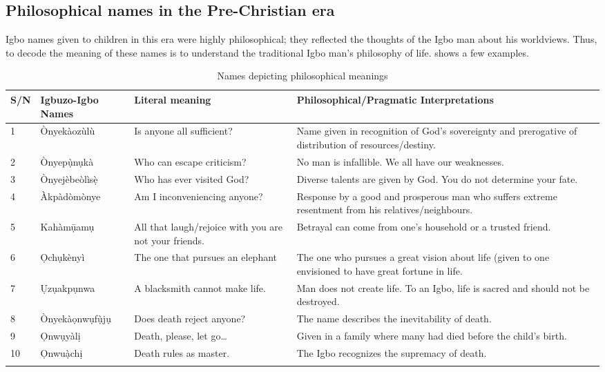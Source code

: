 \documentclass[output=paper]{langscibook}
\begin{document}
\subsection{Philosophical names in the Pre-Christian era}
Igbo names given to children in this era were highly philosophical; they reflected the thoughts of the Igbo man about his worldviews. Thus, to decode the meaning of these names is to understand the traditional Igbo man’s philosophy of life.  shows a few examples.


\begin{sidewaystable}
\caption{\label{tab:owaleke:3.8} Names depicting philosophical meanings}
\begin{tabularx}{\textwidth}{llQQ}
\lsptoprule
{S/N} & {Igbuzo-Igbo Names}     & {Literal meaning}    & {Philosophical/Pragmatic Interpretations}\\\midrule
{1}   & {Ònyekàozùlù}      & {Is anyone all sufficient?}  & {Name given in recognition of God’s sovereignty and prerogative of distribution of resources/destiny.}\\
{2}   & {Ònyepụ̀nụkà}       & {Who can escape criticism?}   & {No man is infallible. We all have our weaknesses.}\\
{3}   & {Ònyejèbeòlìsẹ̀}   & {Who has ever visited God?}  & {Diverse talents are given by God. You do not determine your fate.}\\
{4}   & {Àkpàdòmònye}       & {Am I inconveniencing anyone?}   & {Response by a good and prosperous man who suffers extreme resentment from his relatives/neighbours.}\\
{5}   & {Kahàmụ̄amụ}         & {All that laugh/rejoice with you are not your friends.} & {Betrayal can come from one’s household or a trusted friend.}\\
{6}   & {Ọchụkènyì}         & {The one that pursues an elephant}  & {The one who pursues a great vision about life (given to one envisioned to have great fortune in life.}\\
{7}   & {Ụzụakpụnwa}         & {A blacksmith cannot make life.}   & {Man does not create life. To an Igbo, life is sacred and should not be destroyed.}\\
{8}   & {Ònyekàọnwụfụ̀jụ} & {Does death reject anyone?}    & {The name describes the inevitability of death.}\\
{9}   & {Ọnwụyàlị}         & {Death, please, let go…}   & {Given in a family where many had died before the child’s birth.}\\
{10}  & {Ọnwuạ̀chị}      & {Death rules as master.}    & {The Igbo recognizes the supremacy of death.}\\
\lspbottomrule
\end{tabularx}
\end{sidewaystable}
\end{document}
